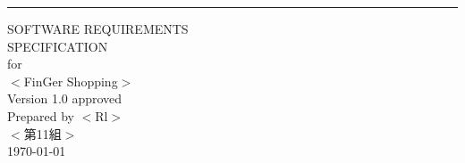 \documentclass{scrreprt}
\date{}
\def\myversion{1.0 }
\begin{document}
\begin{CJK}{UTF8}{bkai}
\begin{flushright}
    \rule{16cm}{5pt}\vskip1cm
    \begin{bfseries}
        \Huge{SOFTWARE REQUIREMENTS\\ SPECIFICATION}\\
        \vspace{1.9cm}
        for\\
        \vspace{1.9cm}
        $<$FinGer Shopping$>$\\
        \vspace{1.9cm}
        \LARGE{Version \myversion approved}\\
        \vspace{1.9cm}
        Prepared by $<$Rl$>$\\
        \vspace{1.9cm}
        $<$第11組$>$\\
        \vspace{1.9cm}
        \today\\
    \end{bfseries}
\end{flushright}

\tableofcontents

\end{CJK}
\end{document}
